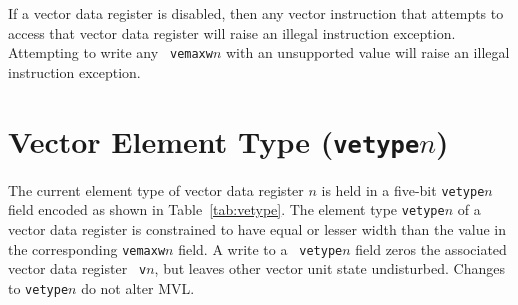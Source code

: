 If a vector data register is disabled, then any vector instruction
that attempts to access that vector data register will raise an
illegal instruction exception.  Attempting to write any {\tt
  vemaxw}$n$ with an unsupported value will raise an illegal
instruction exception.

\section{Vector Element Type ({\tt vetype}$n$)}

The current element type of vector data register $n$ is held in a
five-bit {\tt vetype}$n$ field encoded as shown in
Table~\ref{tab:vetype}.  The element type {\tt vetype}$n$ of a vector
data register is constrained to have equal or lesser width than the
value in the corresponding {\tt vemaxw}$n$ field.  A write to a {\tt
  vetype}$n$ field zeros the associated vector data register {\tt
  v}$n$, but leaves other vector unit state undisturbed.  Changes to
{\tt vetype}$n$ do not alter MVL.

